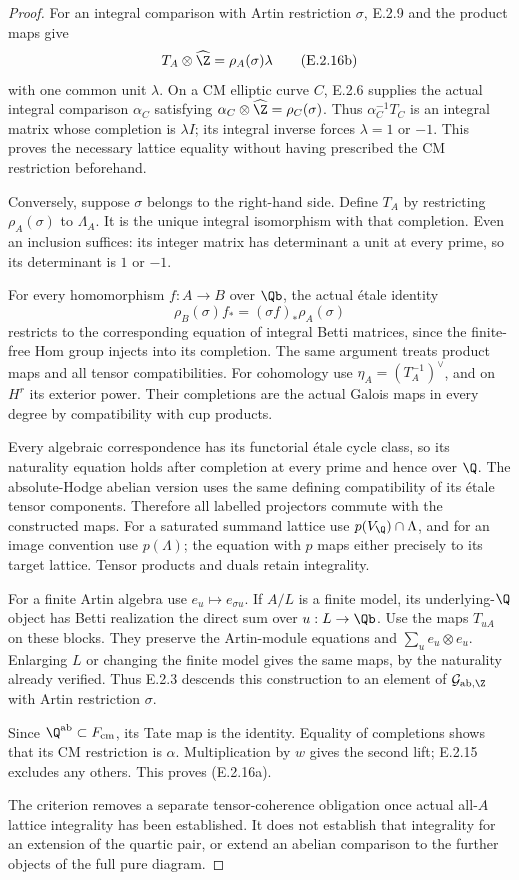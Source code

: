 \begin{proof}
For an integral comparison with Artin restriction \(\sigma\),
E.2.9 and the product maps give
\[
 T_A\otimes\widehat\Z=\rho_A(\sigma)\lambda
 \tag{E.2.16b}
\]
with one common unit \(\lambda\).
On a CM elliptic curve \(C\), E.2.6 supplies the actual
integral comparison \(\alpha_C\) satisfying
\(\alpha_C\otimes\widehat\Z=\rho_C(\sigma)\).
Thus \(\alpha_C^{-1}T_C\) is an integral matrix whose
completion is \(\lambda I\); its integral inverse forces
\(\lambda=1\) or \(-1\).
This proves the necessary lattice equality without having
prescribed the CM restriction beforehand.

Conversely, suppose \(\sigma\) belongs to the right-hand side.
Define \(T_A\) by restricting \(\rho_A(\sigma)\) to
\(\Lambda_A\). It is the unique integral isomorphism with
that completion. Even an inclusion suffices: its integer
matrix has determinant a unit at every prime, so its determinant
is \(1\) or \(-1\).

For every homomorphism \(f:A\to B\) over \(\Qb\), the
actual étale identity
\[
 \rho_B(\sigma)f_*=(\sigma f)_*\rho_A(\sigma)
\]
restricts to the corresponding equation of integral Betti
matrices, since the finite-free Hom group injects into its
completion. The same argument treats product maps and all
tensor compatibilities. For cohomology use
\(\eta_A=(T_A^{-1})^\vee\), and on \(H^r\) its exterior
power. Their completions are the actual Galois maps in every
degree by compatibility with cup products.

Every algebraic correspondence has its functorial étale cycle
class, so its naturality equation holds after completion at
every prime and hence over \(\Q\). The absolute-Hodge
abelian version uses the same defining compatibility of its
étale tensor components. Therefore all labelled projectors
commute with the constructed maps. For a saturated summand
lattice use \(p(V_{\Q})\cap\Lambda\), and for an image
convention use \(p(\Lambda)\); the equation with \(p\) maps
either precisely to its target lattice. Tensor products and
duals retain integrality.

For a finite Artin algebra use \(e_u\mapsto e_{\sigma u}\).
If \(A/L\) is a finite model, its underlying-\(\Q\) object
has Betti realization the direct sum over \(u:L\to\Qb\).
Use the maps \(T_{uA}\) on these blocks. They preserve the
Artin-module equations and
\(\sum_u e_u\otimes e_u\).
Enlarging \(L\) or changing the finite model gives the same
maps, by the naturality already verified. Thus E.2.3 descends
this construction to an element of
\(\mathcal G_{\mathrm{ab},\Z}\) with Artin restriction
\(\sigma\).

Since \(\Q^{\mathrm{ab}}\subset F_{\mathrm{cm}}\), its Tate
map is the identity. Equality of completions shows that its
CM restriction is \(\alpha\).
Multiplication by \(w\) gives the second lift; E.2.15 excludes
any others. This proves (E.2.16a).

The criterion removes a separate tensor-coherence obligation
once actual all-\(A\) lattice integrality has been established.
It does not establish that integrality for an extension of the
quartic pair, or extend an abelian comparison to the further
objects of the full pure diagram.
\end{proof}

